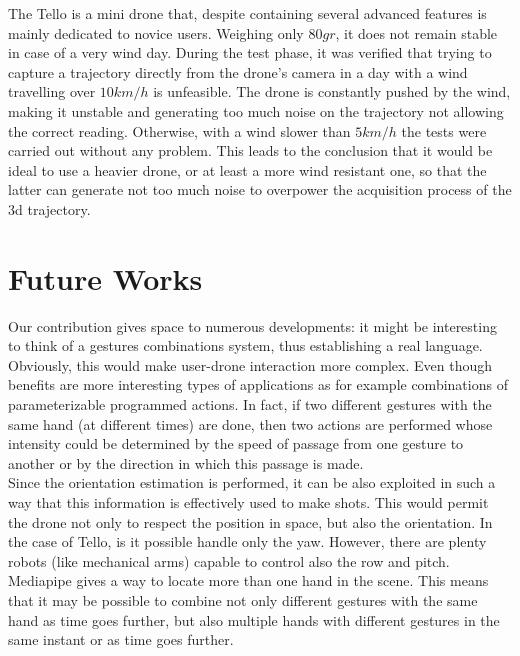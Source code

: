 \noindent The Tello is a mini drone that, despite containing several advanced features is mainly dedicated to novice users. Weighing only $80gr$, it does not remain stable in case of a very wind day. During the test phase, it was verified that trying to capture a trajectory directly from the drone’s camera in a day with a wind travelling over $10km/h$ is unfeasible. The drone is constantly pushed by the wind, making it unstable and generating too much noise on the trajectory not allowing the correct reading. Otherwise, with a wind slower than $5km/h$ the tests were carried out without any problem. This leads to the conclusion that it would be ideal to use a heavier drone, or at least a more wind resistant one, so that the latter can generate not too much noise to overpower the acquisition process of the \gls{3d} trajectory.

\section{Future Works}
\label{sec:fut}

Our contribution gives space to numerous developments: it might be interesting to think of a gestures combinations system, thus establishing a real language. Obviously, this would make user-drone interaction more complex. Even though benefits are more interesting types of applications as for example combinations of parameterizable programmed actions. In fact, if two different gestures with the same hand (at different times) are done, then two actions are performed whose intensity could be determined by the speed of passage from one gesture to another or by the direction in which this passage is made. \\

\noindent Since the orientation estimation is performed, it can be also exploited in such a way that this information is effectively used to make shots. This would permit the drone not only to respect the position in space, but also the orientation. In the case of Tello, is it possible handle only the yaw. However, there are plenty robots (like mechanical arms) capable to control also the row and pitch. Mediapipe gives a way to locate more than one hand in the scene. This means that it may be possible to combine not only different gestures with the same hand as time goes further, but also multiple hands with different gestures in the same instant or as time goes further.